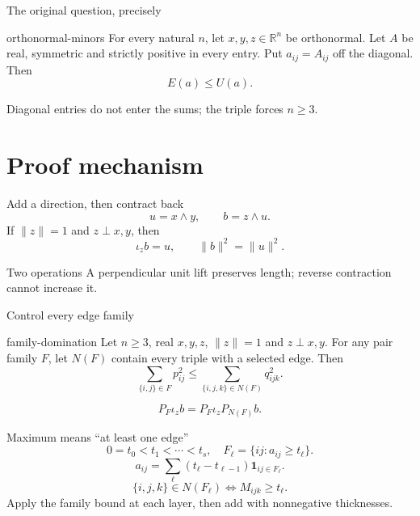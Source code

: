 \documentclass{beamer}
\begin{document}
\begin{frame}{The original question, precisely}
\begin{bookresult}{orthonormal-minors}
For every natural $n$, let $x,y,z\in\mathbb R^n$ be orthonormal. Let $A$ be real, symmetric and strictly positive in every entry. Put $a_{ij}=A_{ij}$ off the diagonal. Then
\[
E(a)\le U(a).
\]
\end{bookresult}
\small Diagonal entries do not enter the sums; the triple forces $n\ge3$.
\end{frame}
\section{Proof mechanism}
\begin{frame}{Add a direction, then contract back}
\[
u=x\wedge y,\qquad b=z\wedge u.
\]
If $\|z\|=1$ and $z\perp x,y$, then
\[
\iota_z b=u,\qquad \|b\|^2=\|u\|^2.
\]
\begin{block}{Two operations}
A perpendicular unit lift preserves length; reverse contraction cannot increase it.
\end{block}
\end{frame}
\begin{frame}{Control every edge family}
\begin{bookresult}{family-domination}
Let $n\ge3$, real $x,y,z$, $\|z\|=1$ and $z\perp x,y$. For any pair family $F$, let $N(F)$ contain every triple with a selected edge. Then
\[
\sum_{\{i,j\}\in F}p_{ij}^2
\le\sum_{\{i,j,k\}\in N(F)}q_{ijk}^2.
\]
\end{bookresult}
\[
P_F\iota_zb=P_F\iota_zP_{N(F)}b.
\]
\end{frame}
\begin{frame}{Maximum means “at least one edge”}
\[
0=t_0<t_1<\cdots<t_s,\quad F_\ell=\{ij:a_{ij}\ge t_\ell\}.
\]
\[
a_{ij}=\sum_\ell(t_\ell-t_{\ell-1})\mathbf1_{ij\in F_\ell}.
\]
\[
\{i,j,k\}\in N(F_\ell)\iff M_{ijk}\ge t_\ell.
\]
Apply the family bound at each layer, then add with nonnegative thicknesses.
\end{frame}
\end{document}
